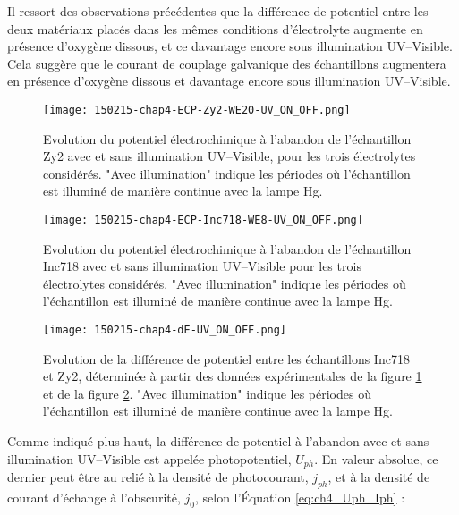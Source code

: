 \begin{refsection}
    Il ressort des observations précédentes que la différence de potentiel entre les deux matériaux placés dans les
    mêmes conditions d’électrolyte augmente en présence d’oxygène dissous, et ce davantage encore sous illumination
    UV--Visible. Cela suggère que le courant de couplage galvanique des échantillons augmentera en présence d’oxygène
    dissous et davantage encore sous illumination UV--Visible.

     \begin{figure}[H]
        \centering
        \texttt{[image: 150215-chap4-ECP-Zy2-WE20-UV\_ON\_OFF.png]}
        \caption{Evolution du potentiel électrochimique à l’abandon de l’échantillon Zy2 avec et sans illumination
        UV--Visible, pour les trois électrolytes considérés. "Avec illumination" indique les périodes où l’échantillon
    est illuminé de manière continue avec la lampe Hg.}
        \label{fig:ch4_ECP_Zy2_UV_ON_OFF}
    \end{figure}

    
     \begin{figure}[H]
        \centering
        \texttt{[image: 150215-chap4-ECP-Inc718-WE8-UV\_ON\_OFF.png]}
        \caption{Evolution du potentiel électrochimique à l’abandon de l’échantillon Inc718 avec et sans illumination
        UV--Visible pour les trois électrolytes considérés. "Avec illumination" indique les périodes où l’échantillon
    est illuminé de manière continue avec la lampe Hg.}
        \label{fig:ch4_ECP_718_UV_ON_OFF}
    \end{figure}


    \begin{figure}[H]
        \centering
        \texttt{[image: 150215-chap4-dE-UV\_ON\_OFF.png]}
        \caption{Evolution de la différence de potentiel entre les échantillons Inc718 et Zy2, déterminée à partir des
            données expérimentales de la figure \ref{fig:ch4_ECP_Zy2_UV_ON_OFF} et de la figure \ref{fig:ch4_ECP_718_UV_ON_OFF}.
            "Avec illumination" indique les périodes où l’échantillon est illuminé de manière continue avec la lampe Hg.}
        \label{fig:ch4_dE_UV_ON_OFF}
    \end{figure}

    Comme indiqué plus haut, la différence de potentiel à l’abandon avec et sans illumination UV--Visible est appelée
    photopotentiel, $U_{ph}$. En valeur absolue, ce dernier peut être au relié à la densité de photocourant, $j_{ph}$, et à la densité
    de courant d’échange à l’obscurité, $j_0$, selon l’Équation \ref{eq:ch4_Uph_Iph} \citep{Memming2008}:


\end{refsection}
